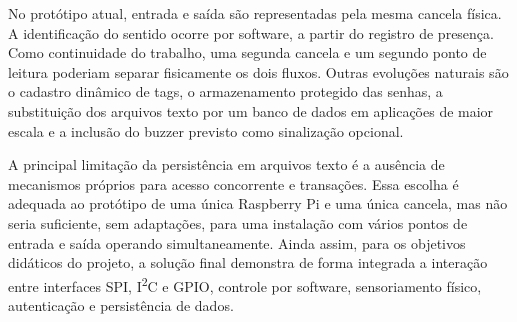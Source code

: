 \documentclass[11pt,a4paper]{article}
\begin{document}
No protótipo atual, entrada e saída são representadas pela mesma cancela física.
A identificação do sentido ocorre por software, a partir do registro de
presença. Como continuidade do trabalho, uma segunda cancela e um segundo ponto
de leitura poderiam separar fisicamente os dois fluxos. Outras evoluções
naturais são o cadastro dinâmico de tags, o armazenamento protegido das senhas,
a substituição dos arquivos texto por um banco de dados em aplicações de maior
escala e a inclusão do buzzer previsto como sinalização opcional.

A principal limitação da persistência em arquivos texto é a ausência de
mecanismos próprios para acesso concorrente e transações. Essa escolha é
adequada ao protótipo de uma única Raspberry Pi e uma única cancela, mas não
seria suficiente, sem adaptações, para uma instalação com vários pontos de
entrada e saída operando simultaneamente. Ainda assim, para os objetivos
didáticos do projeto, a solução final demonstra de forma integrada a interação
entre interfaces SPI, I\textsuperscript{2}C e GPIO, controle por software,
sensoriamento físico, autenticação e persistência de dados.



\renewcommand{\bibname}{Referências}
\renewcommand{\refname}{Referências}

\end{document}
